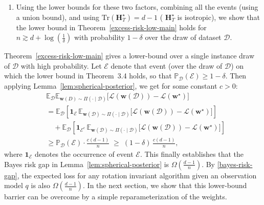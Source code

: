 \documentclass{article}
\theoremstyle{plain}
\theoremstyle{definition}
\theoremstyle{remark}
\begin{document}
\begin{enumerate}
\begin{align*}
& \text{(A):} \quad  \Pi(\|\mathbf z\|_2\le r| \mathcal{D})
\;\ge\;
1-
\exp\!(
-c_1 m
r^2), \\
&  \text{(B):} \quad   \mathbb E_{\Pi(\cdot\,\mid \mathcal{D},\ \|\mathbf z\|_2\le r)}\!\big[\mathbf z^\top \mathbf H_T^\star\,\mathbf z\big] \geq \frac{c_{2}}{n+c_3 d}\,\text{Tr}(\mathbf H_T^\star).
\end{align*}
The lower bound for (A) follows from local log-concavity of
$\Pi(\boldsymbol z\mid \mathcal D)$.
For (B), we use the curvature bound
$\nabla^2 V(\boldsymbol z)\succeq \frac{1}{M}\mathbf I_T$,
which gives an upper bound on the covariance of
$\Pi(\mathbf{z}\mid  \mathcal{D})$ via the Cram\'er-Rao inequality.
This covariance bound, in turn, implies a lower bound on the corresponding second-order moment.
\item Using the lower bounds for these two factors, combining all the events (using a union bound), and using $\text{Tr}(\mathbf H_T^\star) = d-1$ ( $\mathbf H^{\star}_{T}$ is isotropic), we show that the lower bound in Theorem~\ref{excess-risk-low-main} holds for $n\gtrsim d +\log(\frac{1}{\delta})$ with probability $1-\delta$ over the draw of dataset $\mathcal{D}$. 
\end{enumerate}
Theorem~\ref{excess-risk-low-main} gives a lower-bound over a single instance draw of $\mathcal{D}$ with high probability. 
Let $\mathcal E$ denote that event (over the draw of $\mathcal D$) on which the lower bound in Theorem~3.4 holds, so that
$\mathbb P_{\mathcal D}(\mathcal E)\ge 1-\delta$. 
Then applying Lemma~\ref{lem:spherical-posterior}, we get for some constant $c>0$:
\begin{align*}
& \mathbb E_{\mathcal D}\mathbb E_{\boldsymbol w(D)\sim\Pi(\cdot\mid \mathcal{D})}
\big[\mathcal L(\boldsymbol w(\mathcal{D}))-\mathcal L(\boldsymbol w^\star)\big] \\
&=
\mathbb E_{\mathcal D}\!\left[
\mathbf 1_{\mathcal E}\,
\mathbb E_{\boldsymbol w(\mathcal{D})\sim\Pi(\cdot\mid \mathcal{D})}
\big[\mathcal L(\boldsymbol w(\mathcal{D}))-\mathcal L(\boldsymbol w^\star)\big]
\right] \\
&\quad+
\mathbb E_{\mathcal D}\!\left[
\mathbf 1_{\mathcal E^c}\,
\mathbb E_{\boldsymbol w(\mathcal{D})\sim\Pi(\cdot\mid \mathcal{D})}
\big[\mathcal L(\boldsymbol w(\mathcal{D}))-\mathcal L(\boldsymbol w^\star)\big]
\right] \\
&\ge
\mathbb P_{\mathcal D}(\mathcal E)\cdot \frac{c(d-1)}{n}
\;\ge\;
(1-\delta)\,\frac{c(d-1)}{n},
\end{align*}
where $\mathbf1_{\mathcal E}$ denotes the occurrence of event $\mathcal E$. 
This finally establishes that the Bayes risk gap in Lemma~\ref{lem:spherical-posterior} is $\Omega(\frac{d-1}{n})$. By \eqref{bayes-risk-gap}, the expected loss for any rotation invariant algorithm given an observation model $q$ is also $\Omega(\frac{d-1}{n})$. In the next section, we show that this lower-bound barrier can be overcome by a simple reparameterization of the weights.
\end{document}
